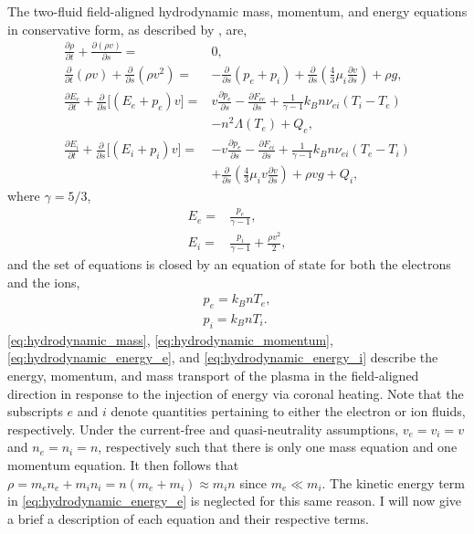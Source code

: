 The two-fluid field-aligned hydrodynamic mass, momentum, and energy equations in conservative form, as described by \citet[Appendix A]{bradshaw_influence_2013}, are,
\begin{align}
    \frac{\partial\rho}{\partial t} + \frac{\partial(\rho v)}{\partial s} =& 0, \label{eq:hydrodynamic_mass} \\
    \frac{\partial}{\partial t}(\rho v) + \frac{\partial}{\partial s}(\rho v^2) =& -\frac{\partial}{\partial s}(p_e + p_i) + \frac{\partial}{\partial s}\left(\frac{4}{3}\mu_i\frac{\partial v}{\partial s}\right) + \rho g, \label{eq:hydrodynamic_momentum} \\
    \frac{\partial E_e}{\partial t} + \frac{\partial}{\partial s} \lbrack(E_e+p_e)v\rbrack =& v\frac{\partial p_e}{\partial s} - \frac{\partial F_{ce}}{\partial s} + \frac{1}{\gamma - 1}k_Bn\nu_{ei}(T_i-T_e) \label{eq:hydrodynamic_energy_e} \\ 
    & - n^2\Lambda(T_e) + Q_{e} , \nonumber \\
    \frac{\partial E_i}{\partial t} + \frac{\partial }{\partial s}\lbrack(E_i+p_i)v\rbrack =& -v\frac{\partial p_e}{\partial s} - \frac{\partial F_{ci}}{\partial s} + \frac{1}{\gamma - 1}k_Bn\nu_{ei}(T_e-T_i) \label{eq:hydrodynamic_energy_i} \\
    & + \frac{\partial}{\partial s}\left(\frac{4}{3}\mu_iv\frac{\partial v}{\partial s}\right) +\rho vg + Q_{i}, \nonumber
\end{align}
where $\gamma=5/3$,
\begin{align}
    E_e =& \frac{p_e}{\gamma - 1} \label{eq:hydrodynamic_energy_e_def}, \\
    E_i =& \frac{p_i}{\gamma - 1} + \frac{\rho v^2}{2}, \label{eq:hydrodynamic_energy_i_def}
\end{align}
and the set of equations is closed by an equation of state for both the electrons and the ions,
\begin{align}
    p_e=k_BnT_e, \label{eq:ideal_gas_law_e}\\
    p_i=k_BnT_i \label{eq:ideal_gas_law_i}.
\end{align}
\autoref{eq:hydrodynamic_mass}, \autoref{eq:hydrodynamic_momentum}, \autoref{eq:hydrodynamic_energy_e}, and \autoref{eq:hydrodynamic_energy_i} describe the energy, momentum, and mass transport of the plasma in the field-aligned direction in response to the injection of energy via coronal heating. Note that the subscripts $e$ and $i$ denote quantities pertaining to either the electron or ion fluids, respectively. Under the current-free and quasi-neutrality assumptions, $v_e=v_i=v$ and $n_e=n_i=n$, respectively such that there is only one mass equation and one momentum equation. It then follows that $\rho = m_en_e+m_in_i = n(m_e + m_i)\approx m_in$ since $m_e \ll m_i$. The kinetic energy term in \autoref{eq:hydrodynamic_energy_e} is neglected for this same reason. I will now give a brief a description of each equation and their respective terms.

